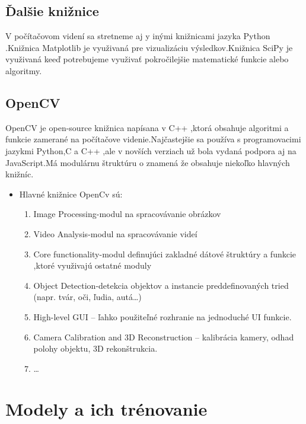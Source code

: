 \documentclass[10pt,twoside,slovak,a4paper]{coursepaper}
\begin{document}
\subsection{Ďalšie knižnice  } \label{ina:nejake}
V počítačovom videní sa stretneme aj y inými knižnicami jazyka Python .Knižnica Matplotlib je využivaná pre vizualizáciu  výsledkov.Knižnica SciPy je využivaná keeď potrebujeme využivať pokročilejšie matematické funkcie alebo algoritmy.


\subsection{OpenCV} \label{ina:nejake}
OpenCV je  open-source knižnica napísana v C++ ,ktorá obsahuje algoritmi a funkcie zamerané na počítačove videnie.Najčastejšie sa používa s programovacimi jazykmi Python,C a C++ ,ale v novších verziach už bola vydaná podpora aj na JavaScript.Má modulárnu štruktúru o znamená že obsahuje niekoľko hlavných knižníc.
\begin{itemize}
\item Hlavné knižnice OpenCv sú:
	\begin{enumerate}
	\item Image Processing-modul na spracovávanie obrázkov
	\item Video Analysis-modul na spracovávanie videí
	\item Core functionality-modul definujúci zakladné dátové štruktúry a funkcie ,ktoré využivajú ostatné moduly
	\item Object Detection-detekcia objektov a instancie preddefinovaných tried (napr. tvár, oči, ľudia, autá…)
	\item High-level GUI – ľahko použiteľné rozhranie na jednoduché UI funkcie.
	\item Camera Calibration and 3D Reconstruction  – kalibrácia kamery, odhad polohy objektu, 3D rekonštrukcia.
	\item \ldots{}
	\end{enumerate}
\end{itemize}

\section{Modely a ich trénovanie} \label{nejaka}
\end{document}

